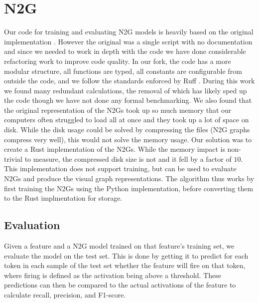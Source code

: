 \section{N2G}
Our code for training and evaluating \ac{N2G} models is heavily based on the original implementation \parencite{foote_apartresearchneuron2graph_2024}.
However the original was a single script with no documentation and since we needed to work in depth with the code we have done considerable refactoring work to improve code quality.
In our fork, the code has a more modular structure, all functions are typed, all constants are configurable from outside the code, and we follow the standards enforced by Ruff \parencite{marsh_astral-shruff_2024}.
During this work we found many redundant calculations, the removal of which has likely sped up the code though we have not done any formal benchmarking.
We also found that the original representation of the \ac{N2G}s took up so much memory that our computers often struggled to load all at once and they took up a lot of space on disk.
While the disk usage could be solved by compressing the files (N2G graphs compress very well), this would not solve the memory usage.
Our solution was to create a Rust implementation of the \ac{N2G}s.
While the memory impact is non-trivial to measure, the compressed disk size is not and it fell by a factor of $10$.
This implementation does not support training, but can be used to evaluate \ac{N2G}s and produce the visual graph representations.
The algorithm thus works by first training the \ac{N2G}s using the Python implementation, before converting them to the Rust implmentation for storage.

\subsection{Evaluation}
Given a feature and a \ac{N2G} model trained on that feature's training set, we evaluate the model on the test set.
This is done by getting it to predict for each token in each sample of the test set whether the feature will fire on that token, where firing is defined as the activation being above a threshold.
These predictions can then be compared to the actual activations of the feature to calculate recall, precision, and F1-score.

